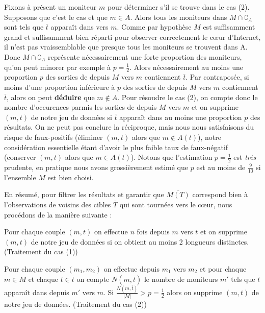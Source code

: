 Fixons à présent un moniteur $m$ pour déterminer s'il se trouve dans le cas (2).
Supposons que c'est le cas et que $m \in A$. Alors tous les moniteurs dans  $M
\cap \complement_A$ sont tels que $\overline{t}$ apparaît dans \traceroute vers
$m$. Comme par hypothèse $M$ est suffisamment grand et suffisamment bien réparti
pour observer correctement le cœur d'Internet, il n'est pas vraissemblable que
presque tous les moniteurs se trouvent dans A. Donc $M \cap \complement_A$
représente nécessairement une forte proportion des moniteurs, qu'on peut minorer
par exemple à $p = \frac{1}{2}$. Alors nécessairement au moins une proportion
$p$ des sorties de \traceroute depuis $M$ vers $m$ contiennent $\overline{t}$.
Par contraposée, si moins d'une proportion inférieure à $p$ des sorties de
\traceroute depuis $M$ vers $m$ contiennent $\overline{t}$, alors on peut {\bf
déduire} que $m \notin A$. Pour résoudre le cas (2), on compte donc le nombre
d'occurences parmis les sorties de \traceroute depuis $M$ vers $m$ et on
supprime $(m, t)$ de notre jeu de données si $\overline{t}$ apparaît dans au
moins une proportion $p$ des résultats. On ne peut pas conclure la réciproque,
mais nous nous satisfaisons du risque de faux-positifs (éliminer $(m, t)$ alors
que $m \notin A(t)$), notre considération essentielle étant d'avoir le plus
faible taux de faux-négatif (conserver $(m, t)$ alors que $m \in A(t)$). Notons
que l'estimation $p = \frac{1}{2}$ est {\em très} prudente, en pratique nous
avons grossièrement estimé que $p$ est au moins de $\frac{9}{10}$ si l'ensemble
$M$ est bien choisi.

En résumé, pour filtrer les résultats et garantir que $\overline{M(T)}$
correspond bien à l'observations de voisins des cibles $\overline{T}$ qui sont
tournées vers le cœur, nous procédons de la manière suivante :
\begin{bulletpoints}
\item Pour chaque couple $(m, t)$ on effectue \traceroute $n$ fois depuis $m$
vers $t$ et on supprime $(m, t)$ de notre jeu de données si on obtient au moins
2 longueurs distinctes. (Traitement du cas (1))
\item Pour chaque couple $(m_1, m_2)$ on effectue \traceroute depuis $m_1$ vers
$m_2$ et pour chaque $m \in M$ et chaque $t \in \overline{t}$ on compte $N(m,
\overline{t})$ le nombre de moniteurs $m'$ tels que $\overline{t}$ apparaît dans \traceroute depuis $m'$
vers $m$. Si $\frac{N(m, \overline{t})}{|M|} > p = \frac{1}{2}$ alors on
supprime $(m, t)$ de notre jeu de données. (Traitement du cas (2))
\end{bulletpoints}

